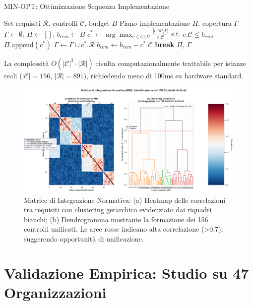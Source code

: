 \begin{algorithm}[H]
\caption{MIN-OPT: Ottimizzazione Sequenza Implementazione}
\label{alg:minopt}
\begin{algorithmic}[1]
\Require Set requisiti $\mathcal{R}$, controlli $\mathcal{C}$, budget $B$
\Ensure Piano implementazione $\Pi$, copertura $\Gamma$
\State $\Gamma \gets \emptyset$, $\Pi \gets []$, $b_{rem} \gets B$
    \State $c^* \gets \arg\max_{c \in \mathcal{C} \setminus \Pi} \frac{|c.\mathcal{R} \setminus \Gamma|}{c.\mathcal{C}}$ s.t. $c.\mathcal{C} \leq b_{rem}$
        \State $\Pi.\text{append}(c^*)$
        \State $\Gamma \gets \Gamma \cup c^*.\mathcal{R}$
        \State $b_{rem} \gets b_{rem} - c^*.\mathcal{C}$
    \Else
        \State \textbf{break}
    \EndIf
\EndWhile
\State \Return $\Pi$, $\Gamma$
\end{algorithmic}
\end{algorithm}

La complessità $O(|\mathcal{C}|^2 \cdot |\mathcal{R}|)$ risulta computazionalmente trattabile per istanze reali ($|\mathcal{C}| = 156$, $|\mathcal{R}| = 891$), richiedendo meno di 100ms su hardware standard.

\begin{figure}[htbp]
\centering
\includegraphics[width=\textwidth]{thesis_figures/cap4/min_matrix_heatmap.pdf}
\caption[Visualizzazione della Matrice MIN]{Matrice di Integrazione Normativa: (a) Heatmap delle correlazioni tra requisiti con clustering gerarchico evidenziato dai riquadri bianchi; (b) Dendrogramma mostrante la formazione dei 156 controlli unificati. Le aree rosse indicano alta correlazione (>0.7), suggerendo opportunità di unificazione.}
\label{fig:min_matrix}
\end{figure}

\section{\texorpdfstring{Validazione Empirica: Studio su 47 Organizzazioni}{4.3 - Validazione Empirica}}
\label{sec:validazione_economica}

